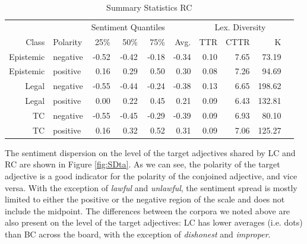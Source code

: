 \documentclass{article}
\begin{document}
\begin{table}[!h]
\centering
{}
\begin{tabular}{rlrrrrrrrr}
  & & \multicolumn{3}{c}{Sentiment Quantiles} & & \multicolumn{3}{c}{Lex. Diversity}\\
   \cmidrule{3-5} \cmidrule{7-9}
  Class & Polarity & 25\% & 50\% & 75\% & Avg. &  TTR & CTTR & K\\
  \bottomrule
Epistemic & negative & -0.52 & -0.42 & -0.18 & -0.34 & 0.10 & 7.65 & 73.19 \\ 
  Epistemic & positive & 0.16 & 0.29 & 0.50 & 0.30 & 0.08 & 7.26 & 94.69 \\ 
  Legal & negative & -0.55 & -0.44 & -0.24 & -0.38 & 0.13 & 6.65 & 198.62 \\ 
  Legal & positive & 0.00 & 0.22 & 0.45 & 0.21 & 0.09 & 6.43 & 132.81 \\ 
  TC & negative & -0.55 & -0.45 & -0.29 & -0.39 & 0.09 & 6.93 & 80.10 \\ 
  TC & positive & 0.16 & 0.32 & 0.52 & 0.31 & 0.09 & 7.06 & 125.27 \\ 
   \hline
\end{tabular}
   \caption{Summary Statistics RC}
   \label{tab:BCstats}
\end{table}

The sentiment dispersion on the level of the target adjectives shared by LC and RC are shown in Figure \ref{fig:SDta}. As we can see, the polarity of the target adjective is a good indicator for the polarity of the conjoined adjective, and vice versa. With the exception of \textit{lawful} and \textit{unlawful}, the sentiment spread is mostly limited to either the positive or the negative region of the scale and does not include the midpoint. The differences between the corpora we noted above are also present on the level of the target adjectives: LC has lower averages (i.e. dots) than BC across the board, with the exception of \textit{dishonest} and \textit{improper}. %
\end{document}
